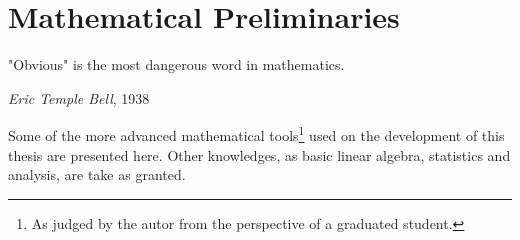 \chapter{Mathematical Preliminaries}
\label{c:math}
\epigraph{"Obvious" is the most dangerous word in mathematics.}{\textit{Eric Temple
Bell}, 1938}

Some of the more advanced mathematical tools\footnote{As judged by the autor
from the perspective of a graduated student.} used on the development of this
thesis are presented here.
Other knowledges, as basic linear algebra, statistics and analysis, are take as
granted.




